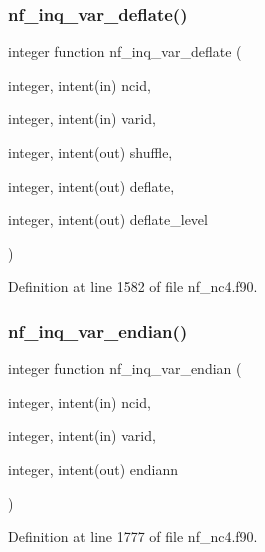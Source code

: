 \subsubsection{\texorpdfstring{nf\+\_\+inq\+\_\+var\+\_\+deflate()}{nf\_inq\_var\_deflate()}}
{\footnotesize\ttfamily integer function nf\+\_\+inq\+\_\+var\+\_\+deflate (\begin{DoxyParamCaption}\item[{integer, intent(in)}]{ncid,  }\item[{integer, intent(in)}]{varid,  }\item[{integer, intent(out)}]{shuffle,  }\item[{integer, intent(out)}]{deflate,  }\item[{integer, intent(out)}]{deflate\+\_\+level }\end{DoxyParamCaption})}



Definition at line 1582 of file nf\+\_\+nc4.\+f90.

\mbox{\label{nf__nc4_8f90_a8811fd80695b7334824133a0cd84b983}} 
\subsubsection{\texorpdfstring{nf\+\_\+inq\+\_\+var\+\_\+endian()}{nf\_inq\_var\_endian()}}
{\footnotesize\ttfamily integer function nf\+\_\+inq\+\_\+var\+\_\+endian (\begin{DoxyParamCaption}\item[{integer, intent(in)}]{ncid,  }\item[{integer, intent(in)}]{varid,  }\item[{integer, intent(out)}]{endiann }\end{DoxyParamCaption})}



Definition at line 1777 of file nf\+\_\+nc4.\+f90.

\mbox{\label{nf__nc4_8f90_a07f7ebc6ed319dc9a1572ebe151daf2f}} 
